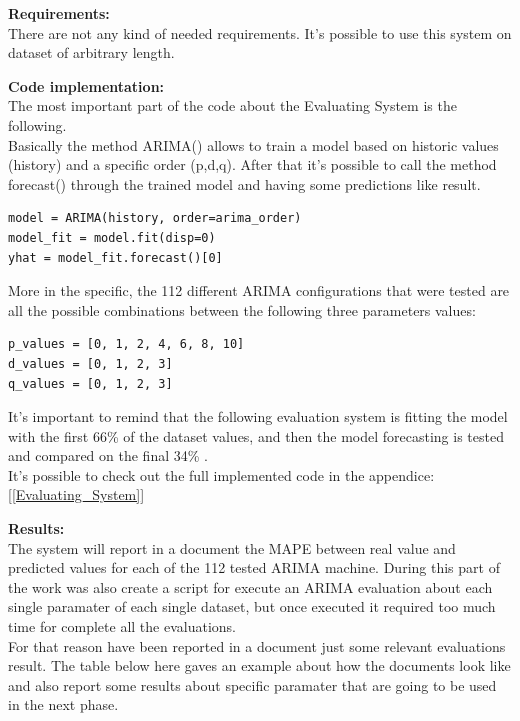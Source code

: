 \textbf{Requirements:}\\
There are not any kind of needed requirements. It's possible to use this system on dataset of arbitrary length.

\textbf{Code implementation:}\\
The most important part of the code about the Evaluating System is the following.\\
Basically the method ARIMA() allows to train a model based on historic values (history) and a specific order (p,d,q). After that it's possible to call the method forecast() through the trained model and having some predictions like result.
\begin{lstlisting}
model = ARIMA(history, order=arima_order)
model_fit = model.fit(disp=0)
yhat = model_fit.forecast()[0]
\end{lstlisting}

More in the specific, the 112 different ARIMA configurations that were tested are all the possible combinations between the following three parameters values:
\begin{lstlisting}
p_values = [0, 1, 2, 4, 6, 8, 10]
d_values = [0, 1, 2, 3]
q_values = [0, 1, 2, 3]
\end{lstlisting}

It's important to remind that the following evaluation system is fitting the model with the first 66\% of the dataset values, and then the model forecasting is tested and compared on the final 34\% .\\

It's possible to check out the full implemented code in the appendice: [\ref{Evaluating_System}]

\newpage

\textbf{Results:}\\
The system will report in a document the MAPE between real value and predicted values for each of the 112 tested ARIMA machine.
During this part of the work was also create a script for execute an ARIMA evaluation about each single paramater of each single dataset, but once executed it required too much time for complete all the evaluations. \\
For that reason have been reported in a document just some relevant evaluations result. The table below here gaves an example about how the documents look like and also report some results about specific paramater that are going to be used in the next phase.\\


